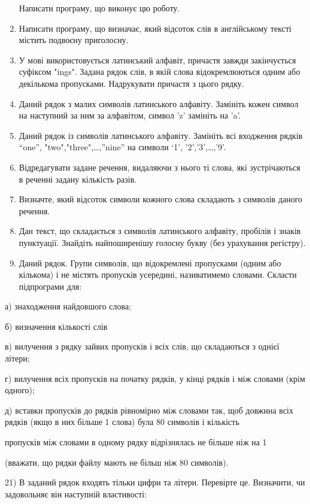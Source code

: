 \documentclass[]{article}
\begin{document}
\begin{enumerate}
  Написати програму, що виконує цю роботу.
\item
  Написати програму, що визначає, який відсоток слів в англійському
  тексті містить подвоєну приголосну.
\item
  У мові використовується латинський алфавіт, причастя завжди
  закінчується суфіксом "ings". Задана рядок слів, в якій слова
  відокремлюються одним або декількома пропусками. Надрукувати причастя
  з цього рядку.
\item
  Даний рядок з малих символів латинського алфавіту. Замініть кожен
  символ на наступний за ним за алфавітом, символ 'z' замініть на 'a'.
\item
  Даний рядок із символів латинського алфавіту. Замініть всі входження
  рядків ``one'', "two","three",\ldots{},''nine'' на символи `1',
  '2','3',\ldots{},'9'.
\item
  Відредагувати задане речення, видаляючи з нього ті слова, які
  зустрічаються в реченні задану кількість разів.
\item
  Визначте, який відсоток символи кожного слова складають з символів
  даного речення.
\item
  Дан текст, що складається з символів латинського алфавіту, пробілів і
  знаків пунктуації. Знайдіть найпоширенішу голосну букву (без
  урахування регістру).
\item
  Даний рядок. Групи символів, що відокремлені пропусками (одним або
  кількома) і не містять пропусків усередині, називатимемо словами.
  Скласти підпрограми для:
\end{enumerate}

а) знаходження найдовшого слова;

б) визначення кількості слів

в) вилучення з рядку зайвих пропусків і всіх слів, що складаються з
однієї літери;

г) вилучення всіх пропусків на початку рядків, у кінці рядків і між
словами (крім одного);

д) вставки пропусків до рядків рівномірно між словами так, щоб довжина
всіх рядків (якщо в них більше 1 слова) була 80 символів і кількість

пропусків між словами в одному рядку відрізнялась не більше ніж на 1

(вважати, що рядки файлу мають не більш ніж 80 символів).

21) В заданий рядок входять тільки цифри та літери. Перевірте це.
Визначити, чи задовольняє він наступній властивості:
\end{document}
